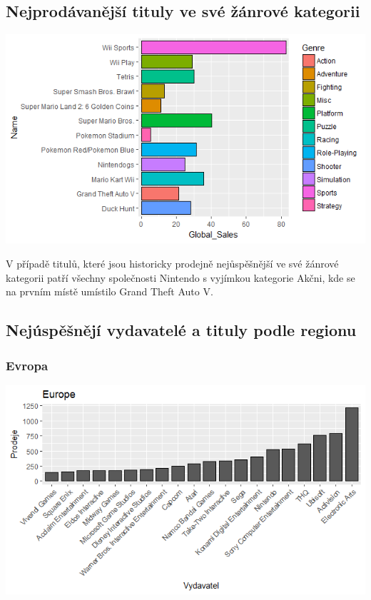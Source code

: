\documentclass[a4paper,11pt]{article}
\begin{document}
\newpage

\subsection{Nejprodávanější tituly ve své žánrové kategorii}

\includegraphics[scale=0.9]{Rplot15}

V případě titulů, které jsou historicky prodejně nejůspěšnější ve své žánrové kategorii patří všechny společnosti Nintendo s vyjímkou kategorie Akčni, kde se na prvním místě umístilo Grand Theft Auto V.

\newpage

\subsection{Nejúspěšnějí vydavatelé a tituly podle regionu}

\subsubsection{Evropa}
\includegraphics[scale=0.8]{Rplot10}
\end{document}
